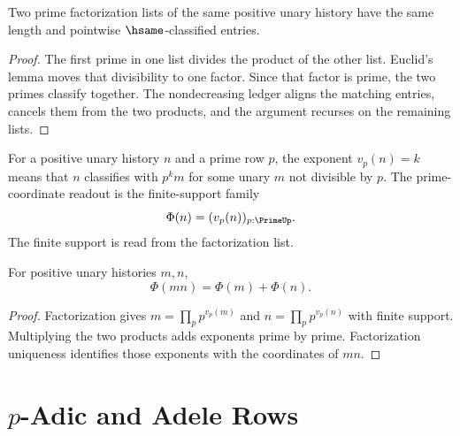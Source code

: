 \begin{theorem}
\label{thm:number-theory-spine-factorization-unique}
Two prime factorization lists of the same positive unary history have the same
length and pointwise $\hsame$-classified entries.
\end{theorem}

\begin{proof}
The first prime in one list divides the product of the other list.  Euclid's
lemma moves that divisibility to one factor.  Since that factor is prime, the
two primes classify together.  The nondecreasing ledger aligns the matching
entries, cancels them from the two products, and the argument recurses on the
remaining lists.
\end{proof}

\begin{definition}
\label{def:number-theory-spine-prime-coordinate}
For a positive unary history $n$ and a prime row $p$, the exponent $v_p(n)=k$
means that $n$ classifies with $p^k m$ for some unary $m$ not divisible by
$p$.  The prime-coordinate readout is the finite-support family
$$
\Phi(n)=(v_p(n))_{p:\PrimeUp}.
$$
The finite support is read from the factorization list.
\end{definition}

\begin{theorem}
\label{thm:number-theory-spine-coordinate-addition}
For positive unary histories $m,n$,
$$
\Phi(mn)=\Phi(m)+\Phi(n).
$$
\end{theorem}

\begin{proof}
Factorization gives
$m=\prod_p p^{v_p(m)}$ and $n=\prod_p p^{v_p(n)}$ with finite support.
Multiplying the two products adds exponents prime by prime.  Factorization
uniqueness identifies those exponents with the coordinates of $mn$.
\end{proof}


\section{\texorpdfstring{$p$}{p}-Adic and Adele Rows}
\label{sec:number-theory-spine-padic-adele}

